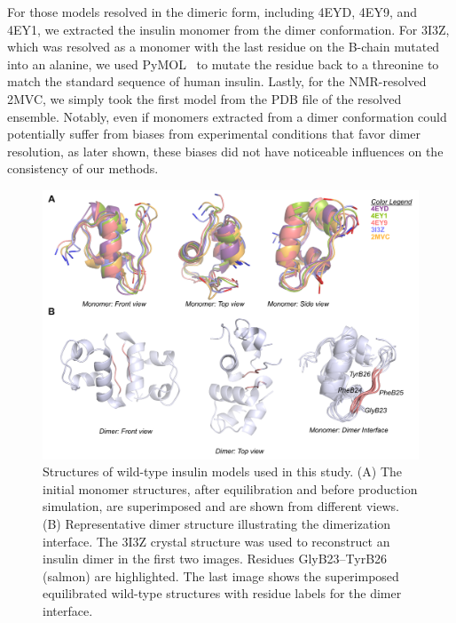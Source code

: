 \documentclass[sn-vancouver]{sn-jnl}
\begin{document}
For those models resolved in the dimeric form, including 4EYD, 4EY9, and 4EY1, we extracted the insulin monomer from the dimer conformation. For 3I3Z, which was resolved as a monomer with the last residue on the B-chain mutated into an alanine, we used PyMOL~\cite{delano2002pymol} to mutate the residue back to a threonine to match the standard sequence of human insulin. Lastly, for the NMR-resolved 2MVC, we simply took the first model from the PDB file of the resolved ensemble. Notably, even if monomers extracted from a dimer conformation could potentially suffer from biases from experimental conditions that favor dimer resolution, as later shown, these biases did not have noticeable influences on the consistency of our methods. 

\begin{figure}[H]
\centering
\includegraphics[width=\textwidth]{Figures/Fig_WTmodels_dimerInterface.png}
\caption{Structures of wild-type insulin models used in this study. (A) The initial monomer structures, after equilibration and before production simulation, are superimposed and are shown from different views. (B) Representative dimer structure illustrating the dimerization interface. The 3I3Z crystal structure was used to reconstruct an insulin dimer in the first two images. Residues GlyB23--TyrB26 (salmon) are highlighted. The last image shows the superimposed equilibrated wild-type structures with residue labels for the dimer interface.}
\label{starting_structures}
\end{figure}
\end{document}
